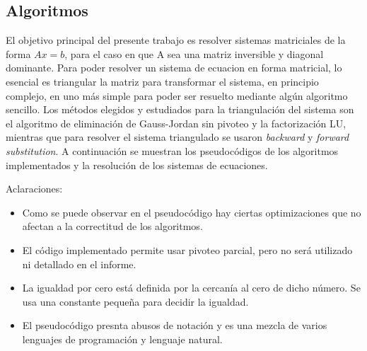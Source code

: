 \subsection{Algoritmos}

El objetivo principal del presente trabajo es resolver sistemas matriciales de la forma $Ax = b$, para el caso en que A sea una matriz inversible y diagonal dominante. Para poder resolver un sistema de ecuacion en forma matricial, lo esencial es triangular la matriz para transformar el sistema, en principio complejo, en uno más simple para poder ser resuelto mediante algún algoritmo sencillo.
Los métodos elegidos y estudiados para la triangulación del sistema son el algoritmo de eliminación de Gauss-Jordan sin pivoteo y la factorización LU, mientras que para resolver el sistema triangulado se usaron \emph{backward} y \emph{forward} \emph{substitution}. A continuación se muestran los pseudocódigos de los algoritmos implementados y la resolución de los sistemas de ecuaciones.



Aclaraciones:
\begin{itemize}
\item Como se puede observar en el pseudocódigo hay ciertas optimizaciones que no afectan a la correctitud de los algoritmos.
\item El código implementado permite usar pivoteo parcial, pero no será utilizado ni detallado en el informe.
\item La igualdad por cero está definida por la cercanía al cero de dicho número. Se usa una constante pequeña para decidir la igualdad.
\item El pseudocódigo presnta abusos de notación y es una mezcla de varios lenguajes de programación y lenguaje natural.
\end{itemize}








